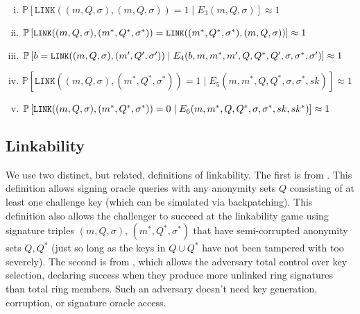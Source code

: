 \documentclass{llncs}
\begin{document}
\begin{definition}
\begin{enumerate}[(i)]
\item $\mathbb{P}\left[\texttt{LINK}((m, Q, \sigma), (m, Q, \sigma)) = 1 \mid E_3(m, Q, \sigma)\right] \approx 1$

\item ${\small \mathbb{P}\left[\texttt{LINK}((m, Q, \sigma), (m^*, Q^*, \sigma^*)) = \texttt{LINK}((m^*, Q^*, \sigma^*), (m, Q, \sigma))\right] \approx 1}$

\item ${\small \mathbb{P}\left[b = \texttt{LINK}((m, Q, \sigma), (m^\prime, Q^\prime, \sigma^\prime)) \mid E_4(b, m, m^*, m^\prime, Q, Q^*, Q^\prime, \sigma, \sigma^*, \sigma^\prime)\right] \approx 1}$

\item $\mathbb{P}\left[ \texttt{LINK}((m, Q, \sigma), (m^*, Q^*, \sigma^*)) = 1 \mid E_5(m, m^*, Q, Q^*, \sigma, \sigma^*, sk) \right] \approx 1$

\item ${\small \mathbb{P}\left[ \texttt{LINK}((m, Q, \sigma), (m^*, Q^*, \sigma^*)) = 0 \mid E_6(m, m^*, Q, Q^*, \sigma, \sigma^*, sk, sk^*) \right] \approx 1}$
\end{enumerate}
\end{definition}


\subsection{Linkability}

We use two distinct, but related, definitions of linkability. The first is from \cite{au2006short}. This definition allows signing oracle queries with any anonymity sets $Q$ consisting of at least one challenge key (which can be simulated via backpatching). This definition also allows the challenger to succeed at the linkability game using signature triples $(m, Q, \sigma)$, $(m^*, Q^*, \sigma^*)$ that have semi-corrupted anonymity sets $Q, Q^*$ (just so long as the keys in $Q \cup Q^*$ have not been tampered with too severely). The second is from \cite{backes2019ring}, which allows the adversary total control over key selection, declaring success when they produce more unlinked ring signatures than total ring members. Such an adversary doesn't need key generation, corruption, or signature oracle access.
\end{document}

